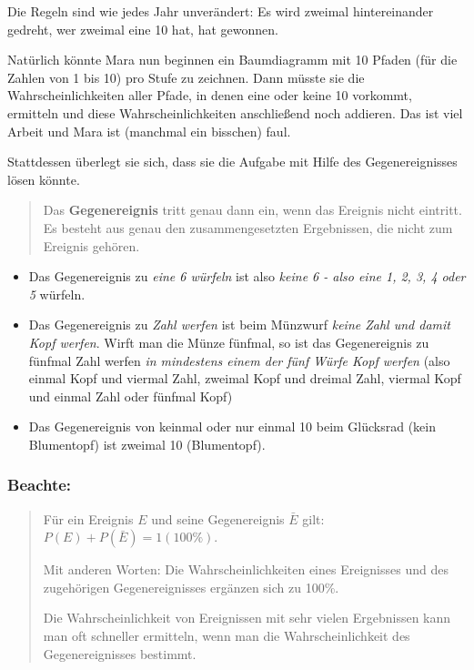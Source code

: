 \documentclass[
  ngerman,
]{book}
\begin{document}
Die Regeln sind wie jedes Jahr unverändert: Es wird zweimal hintereinander gedreht, wer zweimal eine 10 hat, hat gewonnen.

Natürlich könnte Mara nun beginnen ein Baumdiagramm mit 10 Pfaden (für die Zahlen von 1 bis 10) pro Stufe zu zeichnen. Dann müsste sie die Wahrscheinlichkeiten aller Pfade, in denen eine oder keine 10 vorkommt, ermitteln und diese Wahrscheinlichkeiten anschließend noch addieren. Das ist viel Arbeit und Mara ist (manchmal ein bisschen) faul.

Stattdessen überlegt sie sich, dass sie die Aufgabe mit Hilfe des Gegenereignisses lösen könnte.

\begin{quote}
Das \textbf{Gegenereignis} tritt genau dann ein, wenn das Ereignis nicht eintritt. Es besteht aus genau den zusammengesetzten Ergebnissen, die nicht zum Ereignis gehören.
\end{quote}

\begin{itemize}
\item
  Das Gegenereignis zu \emph{eine 6 würfeln} ist also \emph{keine 6 - also eine 1, 2, 3, 4 oder 5} würfeln.
\item
  Das Gegenereignis zu \emph{Zahl werfen} ist beim Münzwurf \emph{keine Zahl und damit Kopf werfen}. Wirft man die Münze fünfmal, so ist das Gegenereignis zu fünfmal Zahl werfen \emph{in mindestens einem der fünf Würfe Kopf werfen} (also einmal Kopf und viermal Zahl, zweimal Kopf und dreimal Zahl, viermal Kopf und einmal Zahl oder fünfmal Kopf)
\item
  Das Gegenereignis von keinmal oder nur einmal 10 beim Glücksrad (kein Blumentopf) ist zweimal 10 (Blumentopf).
\end{itemize}

\hypertarget{beachte-2}{%
\subsubsection*{Beachte:}\label{beachte-2}}

\begin{quote}
Für ein Ereignis \(E\) und seine Gegenereignis \(\bar{E}\) gilt: \(P(E)+P(\bar{E})=1 (100\%)\).

Mit anderen Worten: Die Wahrscheinlichkeiten eines Ereignisses und des zugehörigen Gegenereignisses ergänzen sich zu 100\%.

Die Wahrscheinlichkeit von Ereignissen mit sehr vielen Ergebnissen kann man oft schneller ermitteln, wenn man die Wahrscheinlichkeit des Gegenereignisses bestimmt.
\end{quote}
\end{document}
